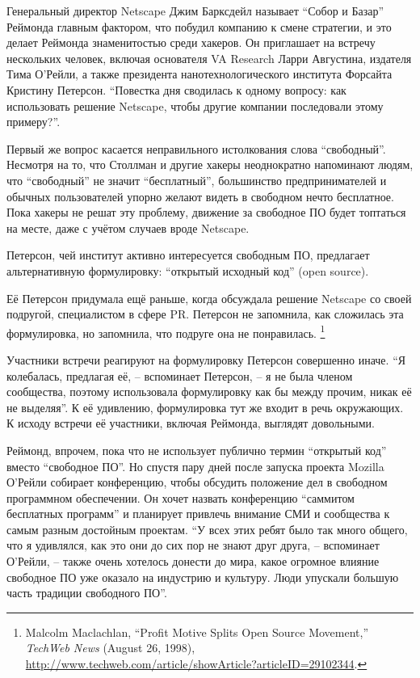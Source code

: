 Генеральный директор Netscape Джим Барксдейл называет \enquote{Собор и Базар} Реймонда главным фактором, что побудил компанию к смене стратегии, и это делает Реймонда знаменитостью среди хакеров. Он приглашает на встречу нескольких человек, включая основателя VA Research Ларри Августина, издателя Тима О'Рейли, а также президента нанотехнологического института Форсайта Кристину Петерсон. \enquote{Повестка дня сводилась к одному вопросу: как использовать решение Netscape, чтобы другие компании последовали этому примеру?}.

Первый же вопрос касается неправильного истолкования слова \enquote{свободный}. Несмотря на то, что Столлман и другие хакеры неоднократно напоминают людям, что \enquote{свободный} не значит \enquote{бесплатный}, большинство предпринимателей и обычных пользователей упорно желают видеть в свободном нечто бесплатное. Пока хакеры не решат эту проблему, движение за свободное ПО будет топтаться на месте, даже с учётом случаев вроде Netscape.

Петерсон, чей институт активно интересуется свободным ПО, предлагает альтернативную формулировку: \enquote{открытый исходный код} (open source).

Её Петерсон придумала ещё раньше, когда обсуждала решение Netscape со своей подругой, специалистом в сфере PR. Петерсон не запомнила, как сложилась эта формулировка, но запомнила, что подруге она не понравилась. \footnote{Malcolm Maclachlan, \enquote{Profit Motive Splits Open Source Movement,} \textit{TechWeb News} (August 26, 1998), \url{http://www.techweb.com/article/showArticle?articleID=29102344}.}

Участники встречи реагируют на формулировку Петерсон совершенно иначе. \enquote{Я колебалась, предлагая её, -- вспоминает Петерсон, -- я не была членом сообщества, поэтому использовала формулировку как бы между прочим, никак её не выделяя}. К её удивлению, формулировка тут же входит в речь окружающих. К исходу встречи её участники, включая Реймонда, выглядят довольными.

Реймонд, впрочем, пока что не использует публично термин \enquote{открытый код} вместо \enquote{свободное ПО}. Но спустя пару дней после запуска проекта Mozilla О'Рейли собирает конференцию, чтобы обсудить положение дел в свободном программном обеспечении. Он хочет назвать конференцию \enquote{саммитом бесплатных программ} и планирует привлечь внимание СМИ и сообщества к самым разным достойным проектам. \enquote{У всех этих ребят было так много общего, что я удивлялся, как это они до сих пор не знают друг друга, -- вспоминает О'Рейли, -- также очень хотелось донести до мира, какое огромное влияние свободное ПО уже оказало на индустрию и культуру. Люди упускали большую часть традиции свободного ПО}.


